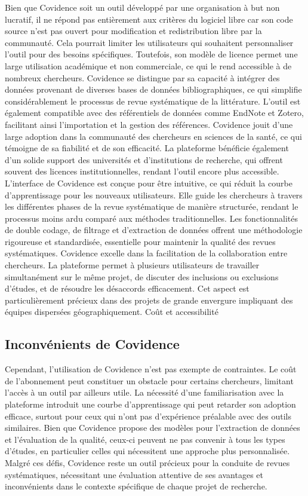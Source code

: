 \documentclass[
  letterpaper,
  DIV=11,
  numbers=noendperiod]{scrreprt}
\begin{document}
Bien que Covidence soit un outil développé par une organisation à but
non lucratif, il ne répond pas entièrement aux critères du logiciel
libre car son code source n'est pas ouvert pour modification et
redistribution libre par la communauté. Cela pourrait limiter les
utilisateurs qui souhaitent personnaliser l'outil pour des besoins
spécifiques. Toutefois, son modèle de licence permet une large
utilisation académique et non commerciale, ce qui le rend accessible à
de nombreux chercheurs. Covidence se distingue par sa capacité à
intégrer des données provenant de diverses bases de données
bibliographiques, ce qui simplifie considérablement le processus de
revue systématique de la littérature. L'outil est également compatible
avec des référentiels de données comme EndNote et Zotero, facilitant
ainsi l'importation et la gestion des références. Covidence jouit d'une
large adoption dans la communauté des chercheurs en sciences de la
santé, ce qui témoigne de sa fiabilité et de son efficacité. La
plateforme bénéficie également d'un solide support des universités et
d'institutions de recherche, qui offrent souvent des licences
institutionnelles, rendant l'outil encore plus accessible. L'interface
de Covidence est conçue pour être intuitive, ce qui réduit la courbe
d'apprentissage pour les nouveaux utilisateurs. Elle guide les
chercheurs à travers les différentes phases de la revue systématique de
manière structurée, rendant le processus moins ardu comparé aux méthodes
traditionnelles. Les fonctionnalités de double codage, de filtrage et
d'extraction de données offrent une méthodologie rigoureuse et
standardisée, essentielle pour maintenir la qualité des revues
systématiques. Covidence excelle dans la facilitation de la
collaboration entre chercheurs. La plateforme permet à plusieurs
utilisateurs de travailler simultanément sur le même projet, de discuter
des inclusions ou exclusions d'études, et de résoudre les désaccords
efficacement. Cet aspect est particulièrement précieux dans des projets
de grande envergure impliquant des équipes dispersées géographiquement.
Coût et accessibilité

\subsection{Inconvénients de
Covidence}\label{inconvuxe9nients-de-covidence}

Cependant, l'utilisation de Covidence n'est pas exempte de contraintes.
Le coût de l'abonnement peut constituer un obstacle pour certains
chercheurs, limitant l'accès à un outil par ailleurs utile. La nécessité
d'une familiarisation avec la plateforme introduit une courbe
d'apprentissage qui peut retarder son adoption efficace, surtout pour
ceux qui n'ont pas d'expérience préalable avec des outils similaires.
Bien que Covidence propose des modèles pour l'extraction de données et
l'évaluation de la qualité, ceux-ci peuvent ne pas convenir à tous les
types d'études, en particulier celles qui nécessitent une approche plus
personnalisée. Malgré ces défis, Covidence reste un outil précieux pour
la conduite de revues systématiques, nécessitant une évaluation
attentive de ses avantages et inconvénients dans le contexte spécifique
de chaque projet de recherche.
\end{document}

